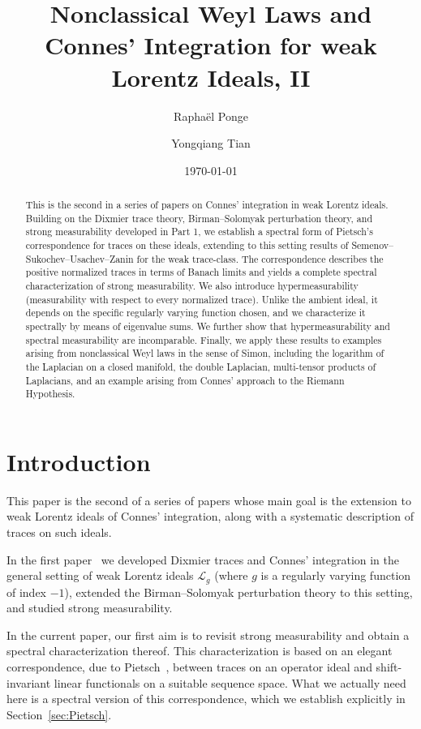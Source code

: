 \documentclass[10pt, a4paper]{amsart}
\title{Nonclassical Weyl Laws and\\ Connes' Integration for weak Lorentz Ideals, II}
\date{\today}
\author{Rapha\"el Ponge}
\author{Yongqiang Tian}
\newcommand{\sL}{\mathscr{L}}
\numberwithin{equation}{section}
\theoremstyle{definition}
\theoremstyle{remark}
\begin{document}
\begin{abstract}
This is the second in a series of papers on Connes' integration in weak Lorentz ideals. Building on the Dixmier trace theory, Birman--Solomyak perturbation theory, and strong measurability developed in Part 1, we establish a spectral form of Pietsch's correspondence for traces on these ideals, extending to this setting results of Semenov--Sukochev--Usachev--Zanin for the weak trace-class. The correspondence describes the positive normalized traces in terms of Banach limits and yields a complete spectral characterization of strong measurability. We also introduce hypermeasurability (measurability with respect to every normalized trace). Unlike the ambient ideal, it depends on the specific regularly varying function chosen, and we characterize it spectrally by means of eigenvalue sums. We further show that hypermeasurability and spectral measurability are incomparable. Finally, we apply these results to examples arising from nonclassical Weyl laws in the sense of Simon, including the logarithm of the Laplacian on a closed manifold, the double Laplacian, multi-tensor products of Laplacians, and an example arising from Connes' approach to the Riemann Hypothesis.
\end{abstract}
\maketitle


\section{Introduction}

This paper is the second of a series of papers whose main goal is the extension to weak Lorentz ideals of Connes' integration, along with a systematic description of traces on such ideals. 

In the first paper~\cite{PT:Part1} we developed Dixmier traces and Connes' integration in the general setting of weak Lorentz ideals $\sL_g$ (where $g$ is a regularly varying function of index $-1$), extended the Birman--Solomyak perturbation theory to this setting, and studied strong measurability. 

In the current paper, our first aim is to revisit strong measurability and obtain a spectral characterization thereof. This characterization is based on an elegant correspondence, due to Pietsch~\cite{Pi:IEOT17,Pi:AM20}, between traces on an operator ideal and shift-invariant linear functionals on a suitable sequence space. What we actually need here is a spectral version of this correspondence, which we establish explicitly in Section~\ref{sec:Pietsch}. 
\end{document}
